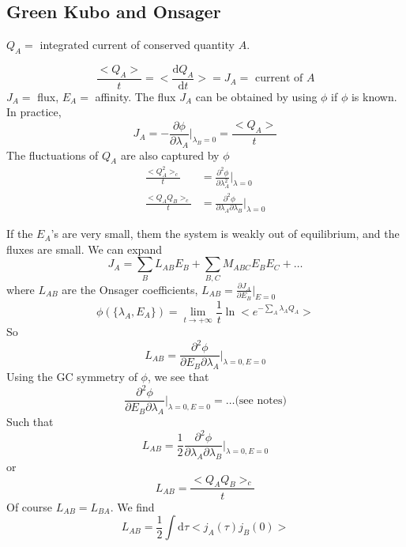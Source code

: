 \documentclass[a4paper]{book}
\theoremstyle{definition}
\theoremstyle{remark}
\begin{document}
\subsection{Green Kubo and Onsager}
$Q_A =$ integrated current of conserved quantity $A$. 

\begin{equation}
    \frac{<Q_A>}{t} = <\frac{\text{d}Q_A}{\text{d}t}> = J_A = \text{ current of } A
\end{equation}
$J_A =$ flux, $E_A =$ affinity. 
The flux $J_A$ can be obtained by using $\phi$ if $\phi$ is known. In practice, 
\begin{equation}
    J_A = -\frac{\partial \phi}{\partial \lambda_A}\Bigg|_{\lambda_B = 0} = \frac{<Q_A>}{t}
\end{equation}
The fluctuations of $Q_A$ are also captured by $\phi$
\begin{equation}
    \begin{aligned}
        \frac{<Q_A^2>_c}{t} &= \frac{\partial^2 \phi }{\partial \lambda_A^2}\Bigg|_{\lambda = 0} \\
        \frac{<Q_AQ_B>_c}{t} &= \frac{\partial^2 \phi}{\partial \lambda_A \partial \lambda_B} \Bigg|_{\lambda = 0}
    \end{aligned}
\end{equation}

If the $E_A$'s are very small, them the system is weakly out of equilibrium, and the fluxes are small. We can expand 
\begin{equation}
    J_A = \sum_B L_{AB}E_B + \sum_{B, C} M_{ABC} E_B E_C + \dots 
\end{equation}
where $L_{AB}$ are the Onsager coefficients, $L_{AB} = \frac{\partial J_A}{\partial E_B}\Bigg|_{E = 0}$
\begin{equation}
    \phi (\{\lambda_A, E_A\}) = \lim_{t \rightarrow +\infty } \frac{1}{t}\ln <e^{-\sum_A \lambda_A Q_A}>
\end{equation}
So 
\begin{equation}
    L_{AB} =  \frac{\partial^2 \phi}{\partial E_B \partial \lambda_A } \Bigg|_{\lambda = 0, E = 0}
\end{equation}
Using the GC symmetry of $\phi$, we see that 
\begin{equation}
    \frac{\partial^2 \phi }{\partial E_B \partial \lambda_A} \Bigg|_{\lambda = 0, E = 0} = \dots \text{(see notes)}
\end{equation}
Such that 
\begin{equation}
    L_{AB} = \frac{1}{2}\frac{\partial^2 \phi}{\partial \lambda_A \partial \lambda_B} \Bigg|_{\lambda = 0, E =0}
\end{equation}
or 
\begin{equation}
    L_{AB} = \frac{<Q_AQ_B>_c}{t}
\end{equation}
Of course $L_{AB} = L_{BA}$. We find 
\begin{equation}
    L_{AB} = \frac{1}{2}\int \text{d}\tau <j_A(\tau)j_B(0)>
\end{equation}
\end{document}
